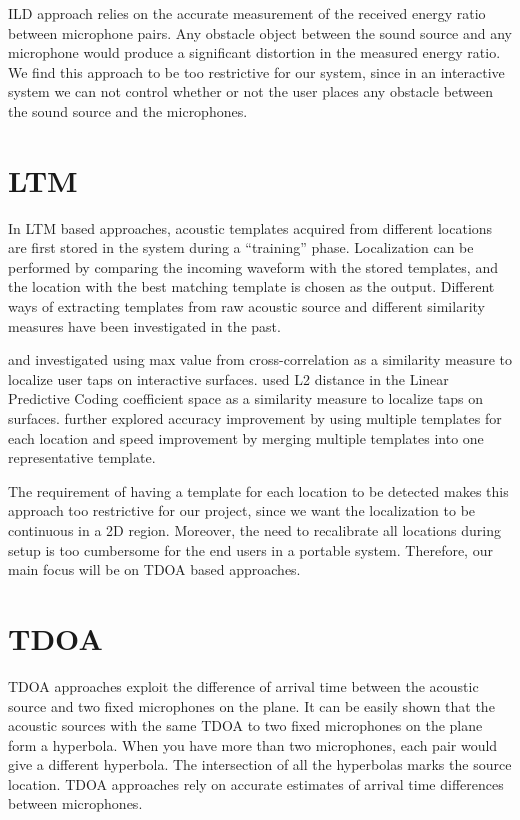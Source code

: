 ILD approach relies on the accurate measurement of the received energy ratio between microphone pairs. Any obstacle object between the sound source and any microphone would produce a significant distortion in the measured energy ratio. We find this approach to be too restrictive for our system, since in an interactive system we can not control whether or not the user places any obstacle between the sound source and the microphones.

\section{LTM}
In LTM based approaches, acoustic templates acquired from different locations are first stored in the system during a ``training'' phase. Localization can be performed by comparing the incoming waveform with the stored templates, and the location with the best matching template is chosen as the output. Different ways of extracting templates from raw acoustic source and different similarity measures have been investigated in the past. 

\cite{extended:tusi} and \cite{ltm:pham} investigated using max value from cross-correlation as a similarity measure to localize user taps on interactive surfaces. \cite{ltm:lpc} used L2 distance in the Linear Predictive Coding coefficient space as a similarity measure to localize taps on surfaces. \cite{ltm:tusi2} further explored accuracy improvement by using multiple templates for each location and speed improvement by merging multiple templates into one representative template.

The requirement of having a template for each location to be detected makes this approach too restrictive for our project, since we want the localization to be continuous in a 2D region.  Moreover, the need to recalibrate all locations during setup is too cumbersome for the end users in a portable system. Therefore, our main focus will be on TDOA based approaches.

\section{TDOA}
TDOA approaches exploit the difference of arrival time between the acoustic source and two fixed microphones on the plane. It can be easily shown that the acoustic sources with the same TDOA to two fixed microphones on the plane form a hyperbola. When you have more than two microphones, each pair would give a different hyperbola. The intersection of all the hyperbolas marks the source location. TDOA approaches rely on accurate estimates of arrival time differences between microphones. 

